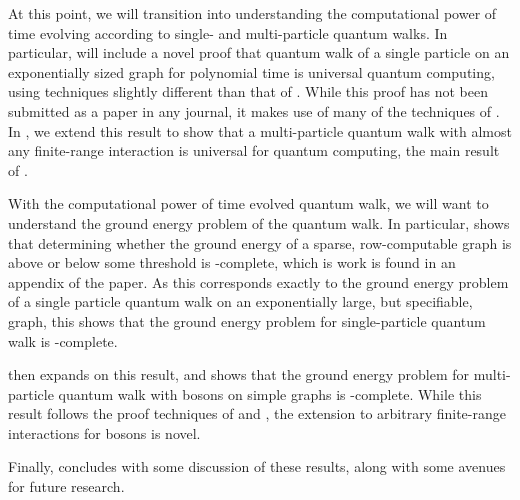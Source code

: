 \documentclass[../thesis-main/thesis-main]{subfiles}
\begin{document}
At this point, we will transition into understanding the computational power of time evolving according to single- and multi-particle quantum walks.  In particular,  will include a novel proof that quantum walk of a single particle on an exponentially sized graph for polynomial time is universal quantum computing, using techniques slightly different than that of \cite{Chi09}.  While this proof has not been submitted as a paper in any journal, it makes use of many of the techniques of \cite{MPQW}.  In , we extend this result to show that a multi-particle quantum walk with almost any finite-range interaction is universal for quantum computing, the main result of \cite{MPQW}.

With the computational power of time evolved quantum walk, we will want to understand the ground energy problem of the quantum walk.  In particular,  shows that determining whether the ground energy of a sparse, row-computable graph is above or below some threshold is \QMA-complete, which is work is found in an appendix of the \cite{BHQMA} paper.  As this corresponds exactly to the ground energy problem of a single particle quantum walk on an exponentially large, but specifiable, graph, this shows that the ground energy problem for single-particle quantum walk is \QMA-complete. 

 then expands on this result, and shows that the ground energy problem for multi-particle quantum walk with bosons on simple graphs is \QMA-complete.  While this result follows the proof techniques of \cite{MPQW} and \cite{XYQMA}, the extension to arbitrary finite-range interactions for bosons is novel.

Finally,  concludes with some discussion of these results, along with some avenues for future research.


\biblio{}
\end{document}
